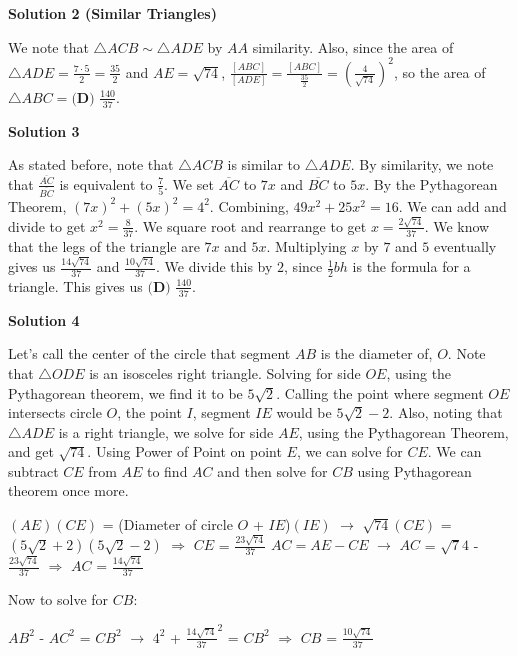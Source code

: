 \begin{enumerate}
\textbf{Solution 2 (Similar Triangles)}

We note that $\triangle ACB \sim \triangle ADE$ by $AA$ similarity. Also, since the area of $\triangle ADE = \frac{7 \cdot 5}2 = \frac{35}2$ and $AE = \sqrt{74}$, $\frac{[ABC]}{[ADE]} = \frac{[ABC]}{\frac{35}2} = \left(\frac{4}{\sqrt{74}}\right)^2$, so the area of $\triangle ABC = \boxed{\textbf{(D) } \frac{140}{37}}$.

 



\textbf{Solution 3}

As stated before, note that $\triangle ACB$ is similar to $\triangle ADE$. By similarity, we note that $\frac{\overline{AC}}{\overline{BC}}$ is equivalent to $\frac{7}{5}$. We set $\overline{AC}$ to $7x$ and $\overline{BC}$ to $5x$. By the Pythagorean Theorem, $(7x)^2+(5x)^2 = 4^2$. Combining, $49x^2+25x^2=16$. We can add and divide to get $x^2=\frac{8}{37}$. We square root and rearrange to get $x=\frac{2\sqrt{74}}{37}$. We know that the legs of the triangle are $7x$ and $5x$. Multiplying $x$ by $7$ and $5$ eventually gives us $\frac {14\sqrt{74}}{37}$ and $\frac {10\sqrt{74}}{37}$. We divide this by $2$, since $\frac{1}{2}bh$ is the formula for a triangle. This gives us $\boxed{\textbf{(D) } \frac{140}{37}}$.

 



\textbf{Solution 4}

Let's call the center of the circle that segment $AB$ is the diameter of, $O$. Note that $\triangle ODE$ is an isosceles right triangle. Solving for side $OE$, using the Pythagorean theorem, we find it to be $5\sqrt{2}$. Calling the point where segment $OE$ intersects circle $O$, the point $I$, segment $IE$ would be $5\sqrt{2}-2$. Also, noting that $\triangle ADE$ is a right triangle, we solve for side $AE$, using the Pythagorean Theorem, and get $\sqrt{74}$. Using Power of Point on point $E$, we can solve for $CE$. We can subtract $CE$ from $AE$ to find $AC$ and then solve for $CB$ using Pythagorean theorem once more.

 $(AE)(CE)$ = (Diameter of circle $O$ + $IE$)$(IE)$ $\rightarrow$ ${\sqrt{74}}(CE)$ = $(5\sqrt{2}+2)(5\sqrt{2}-2)$ $\Rightarrow$ $CE$ = $\frac{23\sqrt{74}}{37}$
$AC = AE - CE$ $\rightarrow$ $AC$ = ${\sqrt74}$ - $\frac{23\sqrt{74}}{37}$ $\Rightarrow$ $AC$ = $\frac{14\sqrt{74}}{37}$

 Now to solve for $CB$:

 $AB^2$ - $AC^2$ = $CB^2$ $\rightarrow$ $4^2$ + $\frac{14\sqrt{74}}{37}^2$ = $CB^2$ $\Rightarrow$ $CB$ = $\frac{10\sqrt{74}}{37}$


\end{enumerate}
